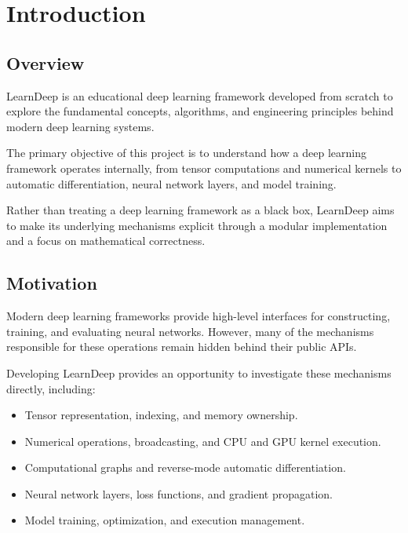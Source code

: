 
\chapter{Introduction}

\section{Overview}

LearnDeep is an educational deep learning framework
developed from scratch to explore the fundamental
concepts, algorithms, and engineering principles
behind modern deep learning systems.

The primary objective of this project is to understand
how a deep learning framework operates internally,
from tensor computations and numerical kernels to
automatic differentiation, neural network layers,
and model training.

Rather than treating a deep learning framework as a
black box, LearnDeep aims to make its underlying
mechanisms explicit through a modular implementation
and a focus on mathematical correctness.

\section{Motivation}

Modern deep learning frameworks provide high-level
interfaces for constructing, training, and evaluating
neural networks. However, many of the mechanisms
responsible for these operations remain hidden behind
their public APIs.

Developing LearnDeep provides an opportunity to
investigate these mechanisms directly, including:

\begin{itemize}
    \item Tensor representation, indexing, and
          memory ownership.
    \item Numerical operations, broadcasting, and
          CPU and GPU kernel execution.
    \item Computational graphs and reverse-mode
          automatic differentiation.
    \item Neural network layers, loss functions,
          and gradient propagation.
    \item Model training, optimization, and execution
          management.
\end{itemize}

